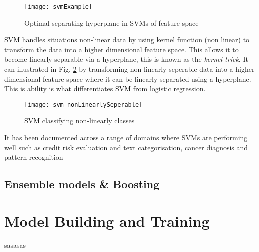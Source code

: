 \begin{figure}[H]
	\texttt{[image: svmExample]}
	\caption{Optimal separating hyperplane in SVMs of feature space \\
		\cite[Source:][]{li_adaptive_2011}
	}
	\label{fig:svmExample}
\end{figure}

SVM handles situations non-linear data by using kernel function (non linear) to transform the data into a higher dimensional feature space. This allows it to become linearly separable via a hyperplane, this is known as the \textit{kernel trick}. It can illustrated in Fig. \ref{fig:svm_nonLinearlySeperable} by transforming non linearly seperable data into a higher dimensional feature space where it can be linearly separated using a hyperplane. This is ability is what differentiates SVM from logistic regression.

\begin{figure}[H]
	\texttt{[image: svm\_nonLinearlySeperable]}
	\caption{SVM classifying non-linearly classes \\
		\cite[Source:][]{burges_tutorial_1998}
	}
	\label{fig:svm_nonLinearlySeperable}
\end{figure}

It has been documented across a range of domains where SVMs are performing well such as credit risk evaluation \cite{van_gestel_credit_2009} and text categorisation, cancer diagnosis and pattern recognition \citep{shin_application_2005}

\subsection{Ensemble models \& Boosting} \label{boosting}
\begin{comment}
In 1907, statistician Sir Francis Galton attended a fair in which there was a competition to judge the weight of an Ox. Upon reviewing the 787 predictions made by the competing public, he observed that while there was a 
\end{comment}


\section{Model Building and Training}
sasasas
